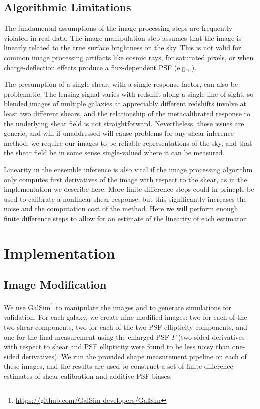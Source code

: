 \documentclass[iop]{emulateapj}
\begin{document}
\subsection{Algorithmic Limitations}
The fundamental assumptions of the image processing steps are
frequently violated in real data. The image manipulation step assumes
that the image is linearly related to the true surface brightness on
the sky. This is not valid for common image processing artifacts like
cosmic rays, for saturated pixels, or when charge-deflection effects
produce a flux-dependent PSF (e.g.,
\citealt{2015JInst..10C5032G}). 

The presumption of a single shear, with a single response factor, can
also be problematic. The lensing signal varies with redshift along a
single line of sight, so blended images of multiple galaxies at
appreciably different redshifts involve at least two different shears,
and the relationship of the metacalibrated response to the underlying
shear field is not straightforward. Nevertheless, these issues are
generic, and will if unaddressed will cause problems for any shear
inference method; we require our images to be reliable representations
of the sky, and that the shear field be in some sense single-valued
where it can be measured.

Linearity in the ensemble inference is also vital if the image
processing algorithm only computes first derivatives of the image with
respect to the shear, as in the implementation we describe here. More
finite difference steps could in princple be used to calibrate a
nonlinear shear response, but this significantly increases the noise
and the computation cost of the method. Here we will perform enough
finite difference steps to allow for an estimate of the linearity of
each estimator.


\section{Implementation}
\subsection{Image Modification}\label{subsec:imagemod}
We use
GalSim\footnote{\url{https://github.com/GalSim-developers/GalSim}} to
manipulate the images and to generate simulations for validation. For
each galaxy, we create nine modified images: two for each of the two
shear components, two for each of the two PSF ellipticity components,
and one for the final measurement using the enlarged PSF $\Gamma$
(two-sided derivatives with respect to shear and PSF ellipticity were
found to be less noisy than one-sided derivatives).  We run the
provided shape measurement pipeline on each of these images, and the
results are used to construct a set of finite difference estimates of
shear calibration and additive PSF biases.
\end{document}
